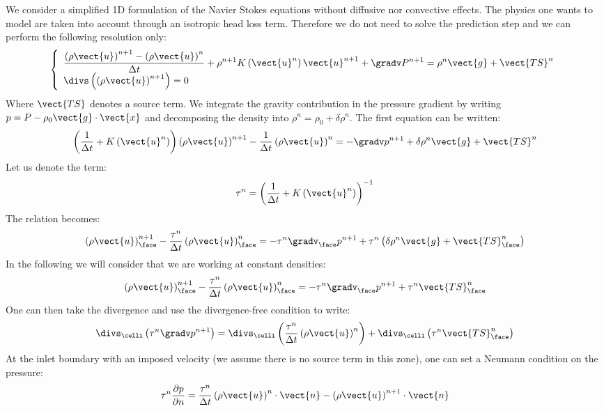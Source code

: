 We consider a simplified 1D formulation of the Navier Stokes equations without
diffusive nor convective effects. The physics one wants to model are taken into
account through an isotropic head loss term. Therefore we do not need to solve
the prediction step and we can perform the following resolution only:
\begin{equation}
    \left\lbrace\begin{array}{l}
    \displaystyle{}\frac{\left(\rho\vect{u}\right)^{n+1}-\left(\rho\vect{u}\right)^{n}}{\Delta t}+\rho^{n+1}K\left(\vect{u}^{n}\right)\vect{u}^{n+1}+\gradv P^{n+1}=\rho^{n}\vect{g}+\vect{TS}^{n} \\
    \displaystyle{}\divs\left(\left(\rho\vect{u}\right)^{n+1}\right)=0
    \end{array}
    \right.
\end{equation}
Where $\vect{TS}$ denotes a source term. We integrate the gravity contribution
in the pressure gradient by writing $p=P-\rho_{0}\vect{g}\cdot\vect{x}$ and
decomposing the density into $\rho^{n}=\rho_{0}+\delta\rho^{n}$. The first
equation can be written:
\begin{equation}
    \left(\frac{1}{\Delta t}+K\left(\vect{u}^{n}\right)\right)\left(\rho\vect{u}\right)^{n+1}-\frac{1}{\Delta t}\left(\rho\vect{u}\right)^{n}=-\gradv p^{n+1}+\delta\rho^{n}\vect{g}+\vect{TS}^{n}
\end{equation}
Let us denote the term:
\begin{equation}
    \tau^{n}=\left(\frac{1}{\Delta t}+K\left(\vect{u}^{n}\right)\right)^{-1}
\end{equation}
The relation becomes:
\begin{equation}
    \left(\rho\vect{u}\right)_{\face}^{n+1}-\frac{\tau^{n}}{\Delta t}\left(\rho\vect{u}\right)_{\face}^{n}=-\tau^{n}\gradv_{\face} p^{n+1}+\tau^{n}\left(\delta\rho^{n}\vect{g}+\vect{TS}_{\face}^{n}\right)
\end{equation}
In the following we will consider that we are working at constant densities:
\begin{equation}
    \left(\rho\vect{u}\right)_{\face}^{n+1}-\frac{\tau^{n}}{\Delta t}\left(\rho\vect{u}\right)_{\face}^{n}=-\tau^{n}\gradv_{\face} p^{n+1}+\tau^{n}\vect{TS}_{\face}^{n}
\end{equation}
One can then take the divergence and use the divergence-free condition to
write:
\begin{equation}
    \divs_{\celli}\left(\tau^{n}\gradv p^{n+1}\right)=\divs_{\celli}\left(\frac{\tau^{n}}{\Delta t}\left(\rho\vect{u}\right)^{n}\right)+\divs_{\celli}\left(\tau^{n}\vect{TS}_{\face}^{n}\right)
\end{equation}
At the inlet boundary with an imposed velocity (we assume there is no source
term in this zone), one can set a Neumann condition on the pressure:
\begin{equation}
    \tau^{n}\frac{\partial p}{\partial n}=\frac{\tau^{n}}{\Delta t}\left(\rho\vect{u}\right)^{n}\cdot\vect{n}-\left(\rho\vect{u}\right)^{n+1}\cdot\vect{n}
\end{equation}

